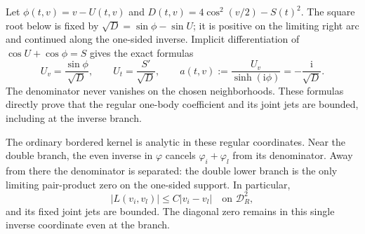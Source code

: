 \documentclass[11pt]{article}
\numberwithin{equation}{section}
\theoremstyle{remark}\newtheorem{remark}[theorem]{Remark}
\newcommand{\ii}{\mathrm i}
\begin{document}
Let $\phi(t,v)=v-U(t,v)$ and
$D(t,v)=4\cos^2(v/2)-S(t)^2$.
The square root below is fixed by
$\sqrt D=\sin\phi-\sin U$; it is positive on the limiting right
arc and continued along the one-sided inverse. Implicit differentiation
of $\cos U+\cos\phi=S$ gives the exact formulas
\begin{equation}\label{eq:regular-explicit}
 U_v=\frac{\sin\phi}{\sqrt D},\qquad
 U_t=\frac{S'}{\sqrt D},\qquad
 a(t,v):=\frac{U_v}{\sinh(\ii\phi)}=-\frac{\ii}{\sqrt D}.
\end{equation}
The denominator never vanishes on the chosen neighborhoods.
These formulas directly prove that the regular one-body coefficient
and its joint jets are bounded, including at the inverse branch.

The ordinary bordered kernel is analytic in these regular coordinates.
Near the double branch, the even inverse in $\varphi$ cancels
$\varphi_i+\varphi_l$ from its denominator. Away from there the
denominator is separated: the double lower branch is the only limiting
pair-product zero on the one-sided support. In particular,
\begin{equation}\label{eq:v-3}
 |L(v_i,v_l)|\le C|v_i-v_l|\quad\text{on }\mathcal D_R^2,
\end{equation}
and its fixed joint jets are bounded. The diagonal zero remains
in this single inverse coordinate even at the branch.
\end{document}
